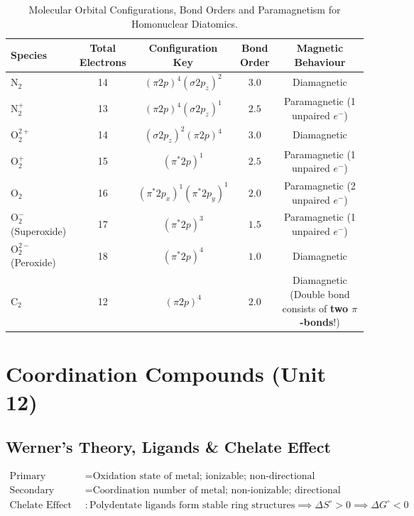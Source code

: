 \documentclass[11pt,a4paper]{article}
\begin{document}
\begin{table}[htbp]
\centering
\small
\renewcommand{\arraystretch}{1.2}
\begin{tabularx}{\textwidth}{L c c c c}
\toprule
\textbf{Species} & \textbf{Total Electrons} & \textbf{Configuration Key} & \textbf{Bond Order} & \textbf{Magnetic Behaviour} \\
\midrule
$\text{N}_2$ & 14 & $(\pi 2p)^4 (\sigma 2p_z)^2$ & $3.0$ & Diamagnetic \\
$\text{N}_2^+$ & 13 & $(\pi 2p)^4 (\sigma 2p_z)^1$ & $2.5$ & Paramagnetic (1 unpaired $e^-$) \\
$\text{O}_2^{2+}$ & 14 & $(\sigma 2p_z)^2 (\pi 2p)^4$ & $3.0$ & Diamagnetic \\
$\text{O}_2^+$ & 15 & $(\pi^* 2p)^1$ & $2.5$ & Paramagnetic (1 unpaired $e^-$) \\
$\text{O}_2$ & 16 & $(\pi^* 2p_x)^1 (\pi^* 2p_y)^1$ & $2.0$ & Paramagnetic (2 unpaired $e^-$) \\
$\text{O}_2^-$ (Superoxide) & 17 & $(\pi^* 2p)^3$ & $1.5$ & Paramagnetic (1 unpaired $e^-$) \\
$\text{O}_2^{2-}$ (Peroxide) & 18 & $(\pi^* 2p)^4$ & $1.0$ & Diamagnetic \\
$\text{C}_2$ & 12 & $(\pi 2p)^4$ & $2.0$ & Diamagnetic (Double bond consists of \textbf{two $\pi$-bonds}!) \\
\bottomrule
\end{tabularx}
\caption{Molecular Orbital Configurations, Bond Orders and Paramagnetism for Homonuclear Diatomics.}
\end{table}

\newpage

\section{Coordination Compounds (Unit 12)}

\subsection{Werner's Theory, Ligands \& Chelate Effect}

\begin{formulabox}
\begin{align}
  \text{Primary Valency} &= \text{Oxidation state of metal; ionizable; non-directional} \\
  \text{Secondary Valency} &= \text{Coordination number of metal; non-ionizable; directional (governs geometry)} \\
  \text{Chelate Effect} &: \text{Polydentate ligands form stable ring structures} \implies \Delta S^\circ > 0 \implies \Delta G^\circ < 0
\end{align}
\end{formulabox}
\end{document}
